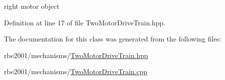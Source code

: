 right motor object 



Definition at line 17 of file Two\+Motor\+Drive\+Train.\+hpp.



The documentation for this class was generated from the following files\+:\begin{DoxyCompactItemize}
\item 
rbe2001/mechanisms/\hyperlink{_two_motor_drive_train_8hpp}{Two\+Motor\+Drive\+Train.\+hpp}\item 
rbe2001/mechanisms/\hyperlink{_two_motor_drive_train_8cpp}{Two\+Motor\+Drive\+Train.\+cpp}\end{DoxyCompactItemize}
